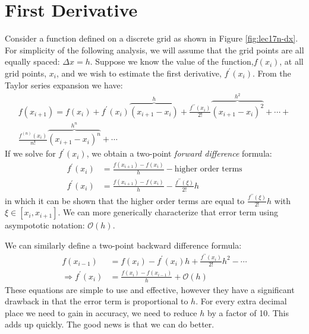 \section{First Derivative}
Consider a function defined on a discrete grid as shown in Figure \ref{fig:lec17n-dx}.  For simplicity of the following analysis, we will assume that the grid points are all equally spaced: $\Delta x = h$.  Suppose we know the value of the function,$f(x_i)$, at all grid points, $x_i$, and we wish to estimate the first derivative, $f^{\prime}(x_i)$.  From the Taylor series expansion we have:
\begin{multline*}
f(x_{i+1}) = f(x_i) + f^{\prime}(x_i)\overbrace{(x_{i+1}-x_i)}^{h} + \frac{f^{\prime \prime}(x_i)}{2!}\overbrace{(x_{i+1} - x_i)^2}^{h^2} + \cdots + \\ \frac{f^{(n)}(x_i)}{n!}\overbrace{(x_{i+1}-x_i)^n}^{h^n} + \cdots
\end{multline*}
If we solve for $f^{\prime}(x_i)$, we obtain a two-point \emph{forward difference} formula:
\begin{align*}
f^{\prime}(x_i) &= \frac{f(x_{i+1}) - f(x_i)}{h} - \text{higher order terms} \\
f^{\prime}(x_i) &= \frac{f(x_{i+1}) - f(x_i)}{h} - \frac{f^{\prime \prime}(\xi)}{2!}h
\end{align*}
in which it can be shown that the higher order terms are equal to $\frac{f^{\prime \prime}(\xi)}{2!}h$ with $\xi \in [x_{i},x_{i+1}]$.  We can more generically characterize that error term using asympototic notation: $\mathcal{O}(h)$.

We can similarly define a two-point backward difference formula:
\begin{align*}
f(x_{i-1}) &= f(x_i) - f^{\prime}(x_i)h + \frac{f^{\prime \prime}(x_i)}{2!}h^2 - \cdots \\
\Rightarrow f^{\prime}(x_{i}) &= \frac{f(x_i) - f(x_{i-1})}{h} + \mathcal{O}(h)
\end{align*}
These equations are simple to use and effective, however they have a significant drawback in that the error term is proportional to $h$.  For every extra decimal place we need to gain in accuracy, we need to reduce $h$ by a factor of 10.  This adds up quickly.  The good news is that we can do better.  

